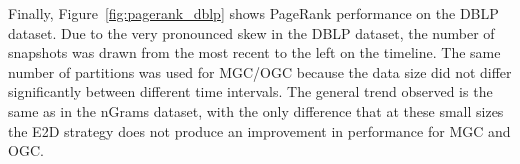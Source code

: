 Finally, Figure~\ref{fig:pagerank_dblp} shows PageRank performance on
the DBLP dataset. Due to the very pronounced skew in the DBLP dataset,
the number of snapshots was drawn from the most recent to the left on
the timeline.  The same number of partitions was used for MGC/OGC
because the data size did not differ significantly between different
time intervals.  The general trend observed is the same as in the
nGrams dataset, with the only difference that at these small sizes the
E2D strategy does not produce an improvement in performance for MGC
and OGC.
